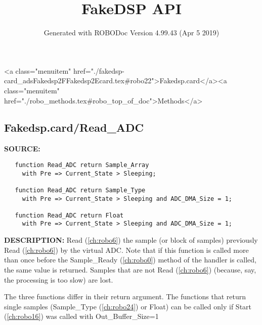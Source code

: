 \documentclass{article}
\title{FakeDSP API}
\author{Generated with ROBODoc Version 4.99.43 (Apr  5 2019)
}
\begin{document}
\maketitle
\printindex
\tableofcontents
\newpage

<a class="menuitem" href="./fakedsp-card_adsFakedsp2FFakedsp2Ecard.tex#robo22">Fakedsp.card</a><a class="menuitem" href="./robo_methods.tex#robo_top_of_doc">Methods</a>\subsection{Fakedsp.card/Read\_ADC}
\textbf{SOURCE:}\hspace{0.08in}\begin{verbatim}
   function Read_ADC return Sample_Array
     with Pre => Current_State > Sleeping;
   
   function Read_ADC return Sample_Type
     with Pre => Current_State > Sleeping and ADC_DMA_Size = 1;
   
   function Read_ADC return Float
     with Pre => Current_State > Sleeping and ADC_DMA_Size = 1;
\end{verbatim}
\textbf{DESCRIPTION:}\hspace{0.08in}
  Read (\ref{ch:robo6}) the sample (or block of samples) previously
  Read (\ref{ch:robo6}) by the virtual ADC.  Note that if this function is called
  more than once before the Sample\_Ready (\ref{ch:robo0}) method of the handler is
  called, the same value is returned.  Samples that are not Read (\ref{ch:robo6})
  (because, say, the processing is too slow) are lost.



  The three functions differ in their return argument. The functions
  that return single samples (Sample\_Type (\ref{ch:robo24}) or Float) can be called
  only if Start (\ref{ch:robo16}) was called with Out\_Buffer\_Size=1
\end{document}
